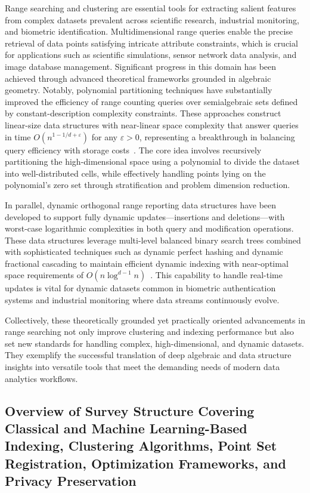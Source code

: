 \documentclass[sigconf]{acmart}
\begin{document}
Range searching and clustering are essential tools for extracting salient features from complex datasets prevalent across scientific research, industrial monitoring, and biometric identification. Multidimensional range queries enable the precise retrieval of data points satisfying intricate attribute constraints, which is crucial for applications such as scientific simulations, sensor network data analysis, and image database management. Significant progress in this domain has been achieved through advanced theoretical frameworks grounded in algebraic geometry. Notably, polynomial partitioning techniques have substantially improved the efficiency of range counting queries over semialgebraic sets defined by constant-description complexity constraints. These approaches construct linear-size data structures with near-linear space complexity that answer queries in time $O(n^{1 - 1/d + \varepsilon})$ for any $\varepsilon > 0$, representing a breakthrough in balancing query efficiency with storage costs~\cite{ref2}. The core idea involves recursively partitioning the high-dimensional space using a polynomial to divide the dataset into well-distributed cells, while effectively handling points lying on the polynomial’s zero set through stratification and problem dimension reduction.

In parallel, dynamic orthogonal range reporting data structures have been developed to support fully dynamic updates—insertions and deletions—with worst-case logarithmic complexities in both query and modification operations. These data structures leverage multi-level balanced binary search trees combined with sophisticated techniques such as dynamic perfect hashing and dynamic fractional cascading to maintain efficient dynamic indexing with near-optimal space requirements of $O(n \log^{d-1} n)$~\cite{ref3}. This capability to handle real-time updates is vital for dynamic datasets common in biometric authentication systems and industrial monitoring where data streams continuously evolve.

Collectively, these theoretically grounded yet practically oriented advancements in range searching not only improve clustering and indexing performance but also set new standards for handling complex, high-dimensional, and dynamic datasets. They exemplify the successful translation of deep algebraic and data structure insights into versatile tools that meet the demanding needs of modern data analytics workflows.

\subsection{Overview of Survey Structure Covering Classical and Machine Learning-Based Indexing, Clustering Algorithms, Point Set Registration, Optimization Frameworks, and Privacy Preservation}
\end{document}
